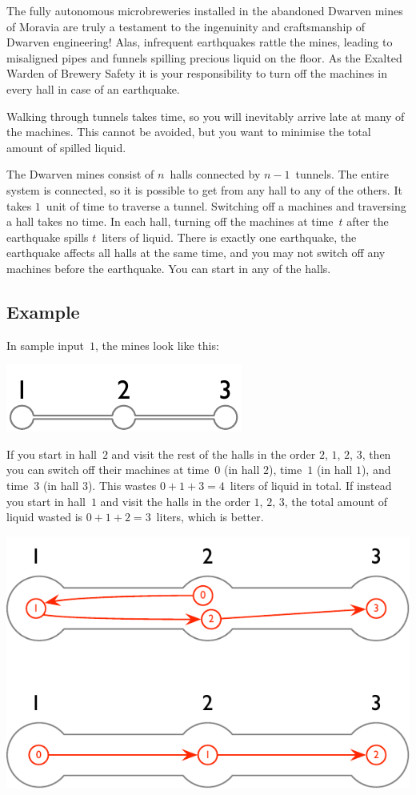 
\noindent
The fully autonomous microbreweries installed in the abandoned Dwarven mines of Moravia are truly a testament to the ingenuinity and craftsmanship of Dwarven engineering!
Alas, infrequent earthquakes rattle the mines, leading to misaligned pipes and funnels spilling precious liquid on the floor.
As the Exalted Warden of Brewery Safety it is your responsibility to turn off the machines in every hall in case of an earthquake.

Walking through tunnels takes time, 
so you will inevitably arrive late at many of the machines.
This cannot be avoided, but you want to minimise the total amount of spilled liquid.

\medskip
The Dwarven mines consist of $n$~halls connected by $n-1$~tunnels.
The entire system is connected, so it is possible to get from any hall to any of the others.
It takes $1$~unit of time to traverse a tunnel.
Switching off a machines and traversing a hall takes no time.
In each hall, turning off the machines at time~$t$ after the earthquake spills $t$~liters of liquid.
There is exactly one earthquake, the earthquake affects all halls at the same time, and you may not switch off any machines before the earthquake.
You can start in any of the halls.

\subsection*{Example}

In sample input~$1$, the mines look like this:

\includegraphics[width=.2\textwidth]{img/sample-1.pdf}

If you start in hall~$2$ and visit the rest of the halls in the order $2$, $1$, $2$, $3$, then you can switch off their machines at time~$0$ (in hall $2$), time~$1$ (in hall $1$), and time~$3$ (in hall $3$).
This wastes $0+1+3=4$~liters of liquid in total.
If instead you start in hall~$1$ and visit the halls in the order $1$, $2$, $3$, the total amount of liquid wasted is $0+1+2=3$~liters, which is better.

\includegraphics[width=.4\textwidth]{img/sample-1-ans.pdf}

